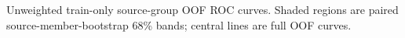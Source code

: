 Unweighted train-only source-group OOF ROC curves. Shaded regions are paired source-member-bootstrap 68\% bands; central lines are full OOF curves.
